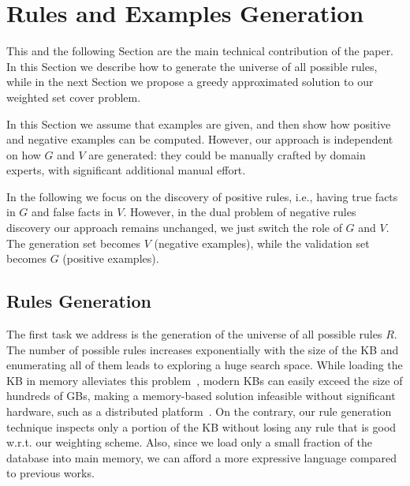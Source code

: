 \section{Rules and Examples Generation} \label{sec:rules_gen}
This and the following Section are the main technical contribution of the paper. In this Section we describe how to generate the universe of all possible rules, while in the next Section we propose a greedy approximated solution to our weighted set cover problem.

In this Section we assume that examples are given, and then show how positive and negative examples can be computed. However, our approach is independent on how $G$ and $V$ are generated: they could be manually crafted by domain experts, with significant additional manual effort.

In the following we focus on the discovery of positive rules, i.e., having true facts in $G$ and false facts in $V$.
However, in the dual problem of negative rules discovery our approach remains unchanged, we just switch the role of $G$ and $V$. The generation set becomes $V$ (negative examples), while the validation set becomes $G$ (positive examples). 




\subsection{Rules Generation} \label{sec:rules_generation}
The first task we address is the generation of the universe of all possible rules $R$. 
The number of possible rules increases exponentially with the size of the KB and enumerating all of them leads to exploring a huge search space. 
While loading the KB in memory alleviates this problem~\cite{galarraga2015fast,Chen:2016}, modern KBs can easily exceed the size of hundreds of GBs, making a memory-based solution infeasible without significant hardware, such as a distributed platform~\cite{Chen:2016,DBLP:conf/sigmod/FaridRIHC16}. On the contrary, our rule generation technique inspects only a portion of the KB without losing any rule that is good w.r.t. our weighting scheme. Also, since we load only a small fraction of the database into main memory, we can afford a more expressive language compared to previous works. %

